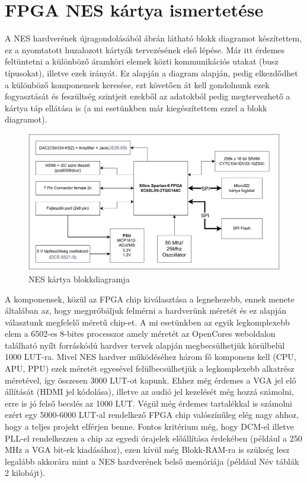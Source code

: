 \chapter{FPGA NES kártya ismertetése}
\label{sec:fpga-nes-board-summary}

A NES hardverének újragondolásából  ábrán látható blokk diagramot készítettem, ez a nyomtatott huzalozott kártyák tervezésének első lépése. Már itt érdemes feltüntetni a különböző áramköri elemek közti kommunikációs utakat (busz típusokat), illetve ezek irányát. Ez alapján a diagram alapján, pedig elkezdődhet a különböző komponensek keresése, ezt követően át kell gondolnunk ezek fogyasztását és feszültség szintjeit ezekből az adatokból pedig megtervezhető a kártya táp ellátása is (a mi esetünkben már kiegészítettem ezzel a blokk diagramot). 

\begin{figure}[H]
	\centering
	\includegraphics[width=150mm, keepaspectratio]{figures/NES-board-blockdiagram}
	\caption{NES kártya blokkdiagramja}
	\label{fig:PCB-blockdiagram}
\end{figure}

A komponensek, közül az FPGA chip kiválasztása a legnehezebb, ennek menete általában az, hogy megpróbáljuk felmérni a hardverünk méretét és ez alapján választunk megfelelő méretű chip-et. A mi esetünkben az egyik legkomplexebb elem a 6502-es 8-bites processzor amely méretét az OpenCores weboldalon található nyílt forráskódú hardver tervek alapján megbecsülhetjük körülbelül 1000 LUT-ra. Mivel NES hardver működéséhez három fő komponens kell (CPU, APU, PPU) ezek méretét egyesével felülbecsülhetjük a legkomplexebb alkatrész méretével, így összesen 3000 LUT-ot kapunk. Ehhez még érdemes a VGA jel elő állítását (HDMI jel kódolása), illetve az audió jel kezelését még hozzá számolni, erre is jó felső becslés az 1000 LUT. Végül még érdemes tartalékkal is számolni ezért egy 5000-6000 LUT-al rendelkező FPGA chip valószínűleg elég nagy ahhoz, hogy a teljes projekt elférjen benne. Fontos kritérium még, hogy DCM-el illetve PLL-el rendelkezzen a chip az egyedi órajelek előállítása érdekében (például a 250 MHz a VGA bit-ek kiadásához), ezen kívül még Blokk-RAM-ra is szükség lesz legalább akkorára mint a NES hardverének belső memóriája (például Név táblák 2 kilobájt).  

